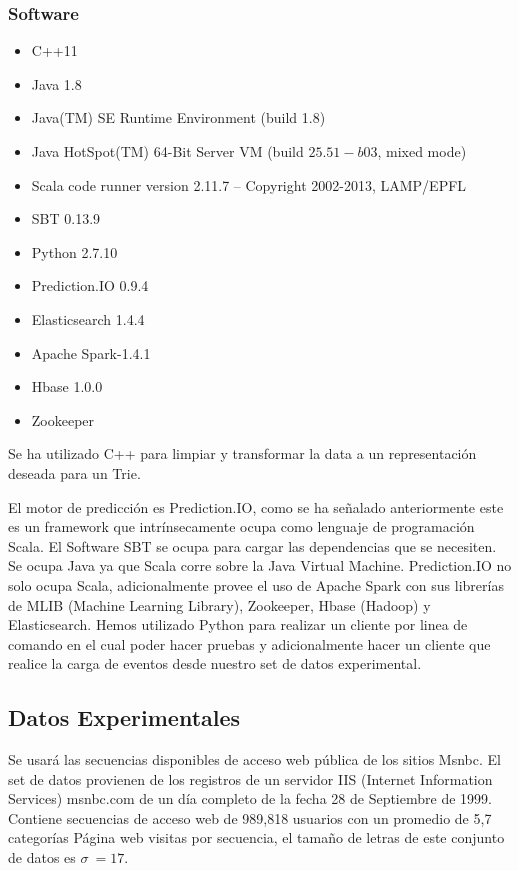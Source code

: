 \subsubsection{Software}

\begin{itemize}
	\item C++11
	\item Java  1.8
	\item Java(TM) SE Runtime Environment (build 1.8)
	\item Java HotSpot(TM) 64-Bit Server VM (build $25.51-b03$, mixed mode)
	\item Scala code runner version 2.11.7 -- Copyright 2002-2013, LAMP/EPFL
	\item SBT 0.13.9 
	\item Python 2.7.10
	\item Prediction.IO 0.9.4
	\item Elasticsearch 1.4.4	
	\item Apache Spark-1.4.1
	\item Hbase 1.0.0
	\item Zookeeper 

\end{itemize}



Se ha utilizado C++ para limpiar y transformar la data  a un representación deseada para un Trie.

El motor de predicción es Prediction.IO, como se ha señalado anteriormente este es un framework que intrínsecamente ocupa como lenguaje de programación Scala. El Software SBT se ocupa para cargar las dependencias que se necesiten. Se ocupa Java ya que Scala corre sobre la Java Virtual Machine. Prediction.IO no solo ocupa Scala, adicionalmente provee el uso de Apache Spark con sus librerías de MLIB (Machine Learning Library), Zookeeper, Hbase (Hadoop) y Elasticsearch. Hemos utilizado Python para realizar un cliente por linea de comando en el cual poder hacer pruebas y adicionalmente hacer un cliente que realice la carga de eventos desde nuestro set de datos experimental. 





\subsection{Datos Experimentales}

Se usará las secuencias disponibles de acceso web pública de los sitios Msnbc. El set de datos provienen de los registros de un servidor IIS (Internet Information Services) msnbc.com de un día completo de la fecha  28 de Septiembre de 1999. 
Contiene secuencias de acceso web de 989,818 usuarios con un promedio de 5,7  categorías Página web visitas por secuencia, el tamaño de letras de este conjunto de datos es $\sigma \ = 17$.


